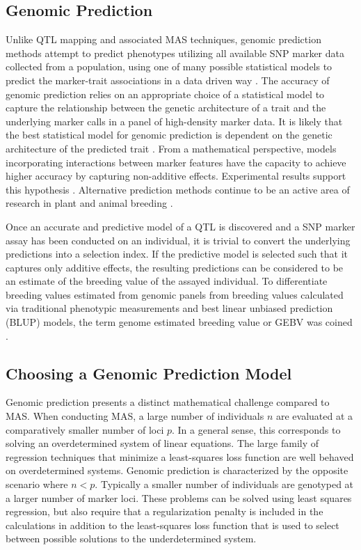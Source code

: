 \subsection*{Genomic Prediction}

Unlike QTL mapping and associated MAS techniques, genomic prediction methods
attempt to predict phenotypes utilizing all available SNP marker data collected 
from a population, using one of many possible statistical models to predict 
the marker-trait associations in a data driven way \citep{meuwissen2001}. 
The accuracy of genomic prediction relies on an appropriate choice of a 
statistical model to capture the relationship between the genetic architecture
of a trait and the underlying marker calls in a panel of high-density marker 
data. It is likely that the best statistical model for genomic prediction is 
dependent on the genetic architecture of
the predicted trait \citep{crossa2010, gonzalez-camacho2012, 
resende2012, cleveland2012, thavamanikumar2015}.  From a mathematical perspective,
models incorporating interactions between marker features have the 
capacity to achieve higher accuracy by capturing non-additive effects.
Experimental results support this hypothesis \citep{gonzalez-camacho2012}. 
Alternative prediction methods continue to be an active area of research 
in plant and animal breeding \citep{koning2012}.

Once an accurate and predictive model of a QTL is discovered and a SNP marker
assay has been conducted on an individual, it is trivial to convert the underlying
predictions into a selection index. If the predictive model is selected 
such that it captures only additive effects, the resulting predictions can be 
considered to be an estimate of the breeding value of the assayed individual.
To differentiate breeding values estimated from genomic panels from breeding values
calculated via traditional phenotypic measurements and best linear unbiased prediction (BLUP)
models, the term genome estimated breeding value or GEBV was coined \citep{meuwissen2001}.

\subsection*{Choosing a Genomic Prediction Model}

Genomic prediction presents a distinct mathematical challenge compared to MAS.
When conducting MAS, a large number of individuals $n$ are evaluated at a
comparatively smaller number of loci $p$. In a general sense, this corresponds 
to solving an overdetermined system of linear equations. The large family of 
regression techniques that minimize a least-squares loss function are well
behaved on overdetermined systems. Genomic prediction is characterized by the opposite
scenario where $n < p$. Typically a smaller number of individuals are genotyped
at a larger number of marker loci. These problems can be solved using least squares regression,
but also require that a regularization penalty is included in the calculations in 
addition to the least-squares loss function that is used to select between 
possible solutions to the underdetermined system.

